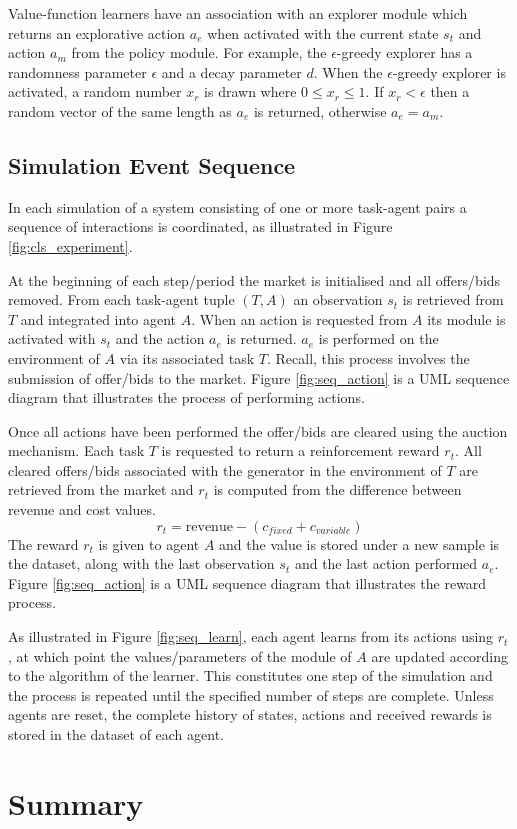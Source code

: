 
Value-function learners have an association with an explorer module which
returns an explorative action $a_e$ when activated with the current state $s_t$
and action $a_m$ from the policy module.  For example, the $\epsilon$-greedy
explorer has a randomness parameter $\epsilon$ and a decay parameter $d$.  When
the $\epsilon$-greedy explorer is activated, a random number $x_r$ is drawn
where $0 \leq x_r \leq 1$.  If $x_r < \epsilon$ then a random vector of the same
length as $a_e$ is returned, otherwise $a_e = a_m$.

\subsection{Simulation Event Sequence}

%

In each simulation of a system consisting of one or more task-agent pairs a
sequence of interactions is coordinated, as illustrated in Figure
\ref{fig:cls_experiment}.

At the beginning of each step/period the market is initialised and all
offers/bids removed.  From each task-agent tuple $(T,A)$ an observation $s_t$
is retrieved from $T$ and integrated into agent $A$.  When an action is
requested from $A$ its module is activated with $s_t$ and the action $a_e$ is
returned.  $a_e$ is performed on the environment of $A$ via its associated task
$T$.  Recall, this process involves the submission of offer/bids to the market.
Figure \ref{fig:seq_action} is a UML sequence diagram that illustrates the
process of performing actions.

Once all actions have been performed the offer/bids are cleared using the
auction mechanism.  Each task $T$ is requested to return a reinforcement reward
$r_t$. All cleared offers/bids associated with the generator in the environment
of $T$ are retrieved from the market and $r_t$ is computed from the difference
between revenue and cost values.
\begin{equation}
r_t = \mbox{revenue} - (c_{fixed} + c_{variable})
\end{equation}
The reward $r_t$ is given to agent $A$ and the value is stored under a new
sample is the dataset, along with the last observation $s_t$ and the last action
performed $a_e$.  Figure \ref{fig:seq_action} is a UML sequence diagram that
illustrates the reward process.

%

As illustrated in Figure \ref{fig:seq_learn}, each agent learns from its
actions using $r_t$, at which point the values/parameters of the module of $A$
are updated according to the algorithm of the learner. This constitutes one
step of the simulation and the process is repeated until the specified number
of steps are complete.  Unless agents are reset, the complete history of
states, actions and received rewards is stored in the dataset of each agent.

\section{Summary}
